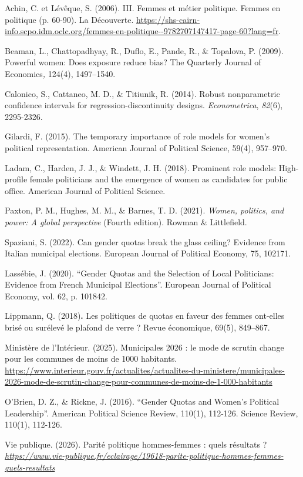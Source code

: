 \documentclass[11pt,a4paper]{article}
\newenvironment{references}{\sloppy\list{}{\leftmargin=1.5em \itemindent=-1.5em \itemsep=0.3em \parsep=0pt}}{\endlist}
\begin{document}
\begin{references}
  \item Achin, C. et Lévêque, S. (2006). III. Femmes et métier politique. Femmes en politique (p. 60-90). La Découverte. \url{https://shs-cairn-info.scpo.idm.oclc.org/femmes-en-politique--9782707147417-page-60?lang=fr}.
  \item Beaman, L., Chattopadhyay, R., Duflo, E., Pande, R., \& Topalova, P. (2009). Powerful women: Does exposure reduce bias? The Quarterly Journal of Economics\textit{,} 124(4), 1497--1540.
  \item Calonico, S., Cattaneo, M. D., \& Titiunik, R. (2014). Robust nonparametric confidence intervals for regression-discontinuity designs. \textit{Econometrica}, \textit{82}(6), 2295-2326.
  \item Gilardi, F. (2015). The temporary importance of role models for women's political representation. American Journal of Political Science, 59(4), 957--970.
  \item Ladam, C., Harden, J. J., \& Windett, J. H. (2018). Prominent role models: High-profile female politicians and the emergence of women as candidates for public office. American Journal of Political Science.
  \item Paxton, P. M., Hughes, M. M., \& Barnes, T. D. (2021). \textit{Women, politics, and power: A global perspective} (Fourth edition). Rowman \& Littlefield.
  \item Spaziani, S. (2022). Can gender quotas break the glass ceiling? Evidence from Italian municipal elections. European Journal of Political Economy, 75, 102171.
  \item Lassébie, J. (2020). ``Gender Quotas and the Selection of Local Politicians: Evidence from French Municipal Elections''. European Journal of Political Economy, vol. 62, p. 101842.
  \item Lippmann, Q. (2018)\textbf{.} Les politiques de quotas en faveur des femmes ont-elles brisé ou surélevé le plafond de verre ? Revue économique, 69(5), 849--867.
  \item Ministère de l'Intérieur. (2025). Municipales 2026 : le mode de scrutin change pour les communes de moins de 1000 habitants. \url{https://www.interieur.gouv.fr/actualites/actualites-du-ministere/municipales-2026-mode-de-scrutin-change-pour-communes-de-moins-de-1-000-habitants}
  \item O'Brien, D. Z., \& Rickne, J. (2016). ``Gender Quotas and Women's Political Leadership''. American Political Science Review, 110(1), 112-126. Science Review, 110(1), 112-126.
  \item Vie publique. (2026). Parité politique hommes-femmes : quels résultats ? \textit{\url{https://www.vie-publique.fr/eclairage/19618-parite-politique-hommes-femmes-quels-resultats}}
\end{references}
\end{document}
